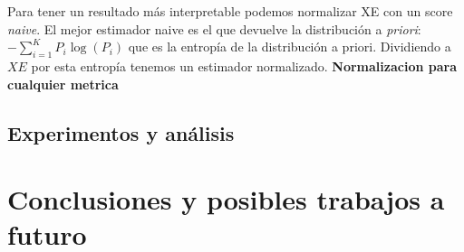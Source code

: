 \documentclass{book}
\begin{document}
Para tener un resultado más interpretable podemos normalizar XE con un score \textit{naive}. El mejor estimador naive es el que devuelve la distribución a \textit{priori}: $-\sum_{i=1}^K P_i \log(P_i)$ que es la entropía de la distribución a priori. Dividiendo a $XE$ por esta entropía tenemos un estimador normalizado.
\textbf{Normalizacion para cualquier metrica}

\section{Experimentos y análisis}



\chapter{Conclusiones y posibles trabajos a futuro}

\end{document}
